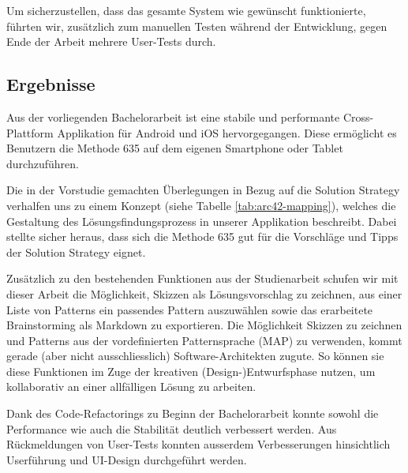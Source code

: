 Um sicherzustellen, dass das gesamte System wie gewünscht funktionierte, führten wir, zusätzlich zum manuellen Testen während der Entwicklung, gegen Ende der Arbeit mehrere User-Tests durch.

\subsection{Ergebnisse}
Aus der vorliegenden Bachelorarbeit ist eine stabile und performante Cross-Plattform Applikation für Android und iOS hervorgegangen. Diese ermöglicht es Benutzern die Methode 635 auf dem eigenen Smartphone oder Tablet durchzuführen.

Die in der Vorstudie gemachten Überlegungen in Bezug auf die Solution Strategy verhalfen uns zu einem Konzept (siehe Tabelle \ref{tab:arc42-mapping}), welches die Gestaltung des Lösungs\-findungs\-prozess in unserer Applikation beschreibt. Dabei stellte sicher heraus, dass sich die Methode 635 gut für die Vorschläge und Tipps der Solution Strategy eignet. 

Zusätzlich zu den bestehenden Funktionen aus der Studienarbeit schufen wir mit dieser Arbeit die Möglichkeit, Skizzen als Lösungsvorschlag zu zeichnen, aus einer Liste von Patterns ein passendes Pattern auszuwählen sowie das erarbeitete Brainstorming als Markdown zu exportieren. Die Möglichkeit Skizzen zu zeichnen und Patterns aus der vordefinierten Patternsprache (MAP) zu verwenden, kommt gerade (aber nicht ausschliesslich) Software-Architekten zugute. So können sie diese Funktionen im Zuge der kreativen (Design-)Entwurfsphase nutzen, um kollaborativ an einer allfälligen Lösung zu arbeiten.

Dank des Code-Refactorings zu Beginn der Bachelorarbeit konnte sowohl die Performance wie auch die Stabilität deutlich verbessert werden. Aus Rückmeldungen von User-Tests konnten ausserdem Verbesserungen hinsichtlich Userführung und UI-Design durchgeführt werden.
